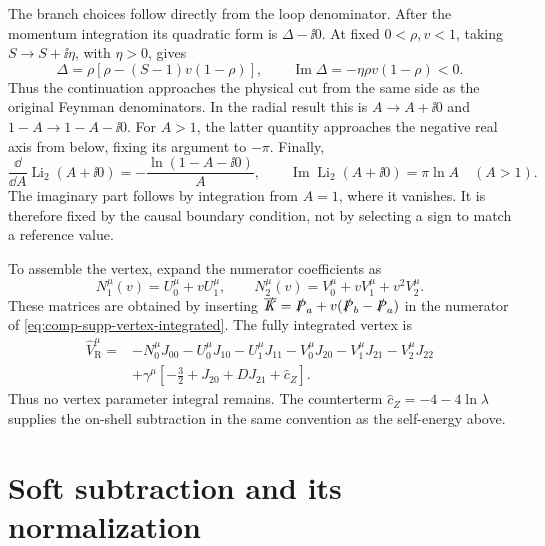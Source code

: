 The branch choices follow directly from the loop denominator.
After the momentum integration its quadratic form is
$\Delta-\ii0$. At fixed $0<\rho,v<1$, taking
$S\to S+\ii\eta$, with $\eta>0$, gives
\begin{equation}
 \Delta=\rho[\rho-(S-1)v(1-\rho)],\qquad
 \operatorname{Im}\Delta=-\eta\rho v(1-\rho)<0.
\end{equation}
Thus the continuation approaches the physical cut from the same
side as the original Feynman denominators. In the radial result
this is $A\to A+\ii0$ and $1-A\to1-A-\ii0$. For $A>1$,
the latter quantity approaches the negative real axis from below,
fixing its argument to $-\pi$. Finally,
\begin{equation}
 \frac{\dd}{\dd A}\operatorname{Li}_2(A+\ii0)
      =-\frac{\ln(1-A-\ii0)}{A},\qquad
 \operatorname{Im}\operatorname{Li}_2(A+\ii0)=\pi\ln A
 \quad(A>1).
\end{equation}
The imaginary part follows by integration from $A=1$, where it
vanishes. It is therefore fixed by the causal boundary condition,
not by selecting a sign to match a reference value.

To assemble the vertex, expand the numerator coefficients as
\begin{equation}
 N_1^\mu(v)=U_0^\mu+vU_1^\mu,\qquad
 N_2^\mu(v)=V_0^\mu+vV_1^\mu+v^2V_2^\mu.
\end{equation}
These matrices are obtained by inserting
$\slashed{\overline K}=\slashed P_a+v(\slashed P_b-\slashed P_a)$
in the numerator of \eqref{eq:comp-supp-vertex-integrated}.
The fully integrated vertex is
\begin{equation}
 \begin{aligned}
 \widehat V_{\mathrm R}^\mu={}&-N_0^\mu J_{00}
 -U_0^\mu J_{10}-U_1^\mu J_{11}
 -V_0^\mu J_{20}-V_1^\mu J_{21}-V_2^\mu J_{22}\\
 &+\gamma^\mu\left[-\frac32+J_{20}+D J_{21}+\widehat c_Z\right].
 \end{aligned}
 \label{eq:comp-supp-vertex-closed}
\end{equation}
Thus no vertex parameter integral remains. The counterterm
$\widehat c_Z=-4-4\ln\lambda$ supplies the on-shell subtraction
in the same convention as the self-energy above.





\section{Soft subtraction and its normalization}
